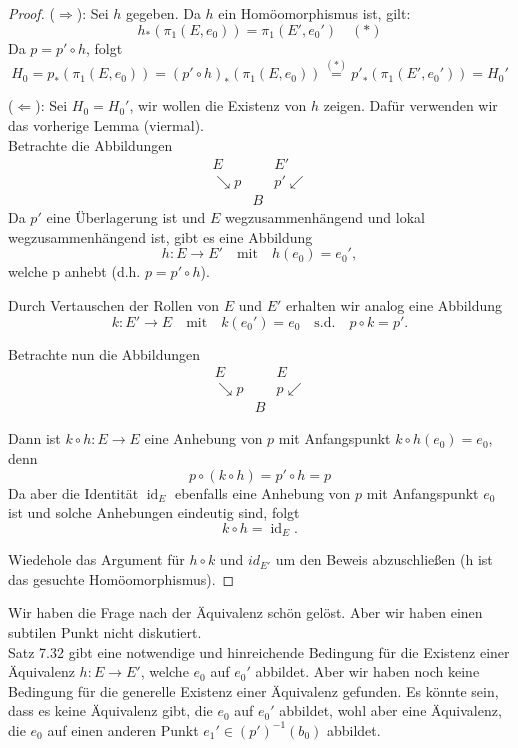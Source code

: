 \documentclass[fleqn, 12pt, letterpaper]{article}
\begin{document}
\begin{proof}
(\( \Rightarrow \)): Sei \( h \) gegeben. Da \( h \) ein Homöomorphismus ist, gilt:
\[
h_*(\pi_1(E,e_0))=\pi_1(E',e_0')  \quad (*)
\]
Da \( p = p' \circ h \), folgt
\[
H_0 = p_* \left( \pi_1(E, e_0) \right) 
= (p' \circ h)_* \left( \pi_1(E, e_0) \right) 
\overset{(*)}{=} {p'}_* \left( \pi_1(E', e_0') \right) 
= H_0'
\]

(\( \Leftarrow \)): Sei \( H_0 = H_0' \), wir wollen die Existenz von \( h \) zeigen. Dafür verwenden wir das vorherige Lemma (viermal).\\

Betrachte die Abbildungen
\[
\begin{array}{ccc}
E &  & E' \\
\searrow p & & p' \swarrow \\
& B &
\end{array}
\]
Da \( p'  \) eine Überlagerung ist und \( E \) wegzusammenhängend und lokal wegzusammenhängend ist, gibt es eine Abbildung
\[
h : E \to E'
\quad \text{mit} \quad h(e_0)=e_0',
\]
welche p anhebt (d.h. \( p = p' \circ h \)).

Durch Vertauschen der Rollen von \( E \) und \( E' \) erhalten wir analog eine Abbildung
\[
k : E' \to E
\quad \text{mit} \quad k(e_0')=e_0 \quad \text{s.d.} \quad p \circ k= p'.
\]

Betrachte nun die Abbildungen
\[
\begin{array}{ccc}
E &  & E \\
\searrow p & & p \swarrow \\
& B &
\end{array}
\]

Dann ist \( k \circ h : E \to E \) eine Anhebung von \( p \) mit Anfangspunkt \(k\circ h(e_0)= e_0 \), denn
\[
p\circ(k\circ h)=p'\circ h = p
\]
Da aber die Identität \( \operatorname{id}_E \) ebenfalls eine Anhebung von \( p \) mit Anfangspunkt \( e_0 \) ist und solche Anhebungen eindeutig sind, folgt
\[
k\circ h= \operatorname{id}_E.
\]

Wiedehole das Argument für $h\circ k$ und $id_{E'}$ um den Beweis abzuschließen (h ist das gesuchte Homöomorphismus).


\end{proof}

Wir haben die Frage nach der Äquivalenz schön gelöst. Aber wir haben einen subtilen Punkt nicht diskutiert.\\

{Satz 7.32} gibt eine notwendige und hinreichende Bedingung für die Existenz einer Äquivalenz \( h : E \to E' \), welche \( e_0 \) auf \( e_0' \) abbildet. Aber wir haben noch keine Bedingung für die generelle Existenz einer Äquivalenz gefunden. Es könnte sein, dass es keine Äquivalenz gibt, die \( e_0 \) auf \( e_0' \) abbildet, wohl aber eine Äquivalenz, die \( e_0 \) auf einen anderen Punkt \( e_1' \in (p')^{-1}(b_0) \) abbildet.\\
\end{document}
